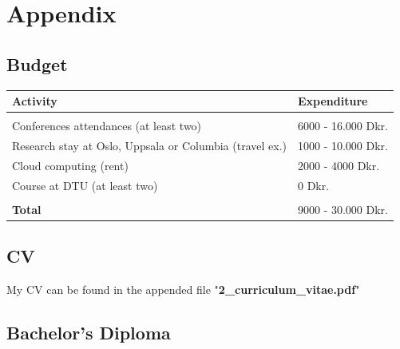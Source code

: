 \documentclass[a4paper]{article}
\begin{document}
\pagebreak
\section{Appendix}

\subsection{Budget}

\begin{center}
\begin{tabular}{  m{10cm} m{4cm} } 

	\hline
	\textbf{Activity}    & \textbf{Expenditure}\\
	\hline
	    &                               \\
	Conferences attendances (at least two)   & 6000 - 16.000 Dkr.                       \\
    Research stay at Oslo, Uppsala or Columbia (travel ex.)  & 1000 - 10.000 Dkr.				\\
	Cloud computing (rent)   & 2000 - 4000 Dkr.			                                \\
    Course at DTU (at least two) & 0 Dkr.			                                \\
 	    &                               \\
 	\hline
    \textbf{Total}       & 9000 - 30.000 Dkr.			    \\
    \hline

\end{tabular}
\end{center}


\pagebreak
\subsection{CV}

My CV can be found in the appended file "\textbf{2\_curriculum\_vitae.pdf}"

\subsection{Bachelor's Diploma}
\end{document}
